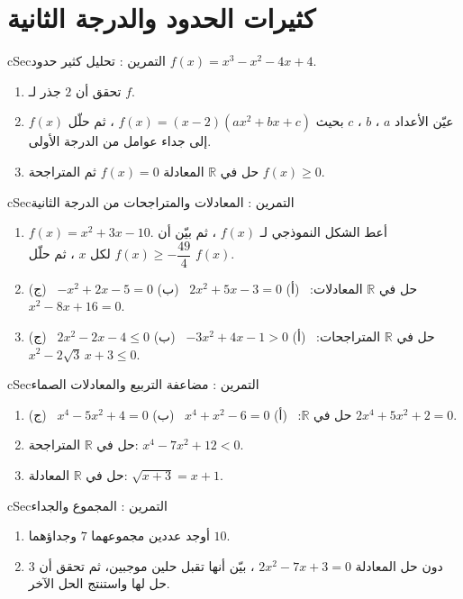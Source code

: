 \documentclass[12pt,a4paper]{article}
\newenvironment{BOX}[2]{\begin{otherlanguage}{english}\begin{arbox}{#1}{#2}}{\end{arbox}\end{otherlanguage}}
\newcounter{exo}
\newenvironment{tamrin}[1]{\stepcounter{exo}\begin{BOX}{cSec}{التمرين \theexo: #1}}{\end{BOX}}
\newcommand{\R}{\mathbb{R}}
\begin{document}
\section{كثيرات الحدود والدرجة الثانية}
\begin{tamrin}{تحليل كثير حدود}
$f(x)=x^3-x^2-4x+4$.
\begin{enumerate}
\item تحقق أن $2$ جذر لـ $f$.
\item عيّن الأعداد $a$ ، $b$ ، $c$ بحيث $f(x)=(x-2)\left(ax^2+bx+c\right)$ ، ثم حلّل $f(x)$ إلى جداء عوامل من الدرجة الأولى.
\item حل في $\R$ المعادلة $f(x)=0$ ثم المتراجحة $f(x)\ge0$.
\end{enumerate}
\end{tamrin}

\begin{tamrin}{المعادلات والمتراجحات من الدرجة الثانية}
\begin{enumerate}
\item $f(x)=x^2+3x-10$. أعط الشكل النموذجي لـ $f(x)$ ، ثم بيّن أن $f(x)\ge-\dfrac{49}{4}$ لكل $x$ ، ثم حلّل $f(x)$.
\item حل في $\R$ المعادلات: \ (أ) $2x^2+5x-3=0$ \ (ب) $-x^2+2x-5=0$ \ (ج) $x^2-8x+16=0$.
\item حل في $\R$ المتراجحات: \ (أ) $-3x^2+4x-1>0$ \ (ب) $2x^2-2x-4\le0$ \ (ج) $x^2-2\sqrt3\,x+3\le0$.
\end{enumerate}
\end{tamrin}

\begin{tamrin}{مضاعفة التربيع والمعادلات الصماء}
\begin{enumerate}
\item حل في $\R$: \ (أ) $x^4+x^2-6=0$ \ (ب) $x^4-5x^2+4=0$ \ (ج) $2x^4+5x^2+2=0$.
\item حل في $\R$ المتراجحة: $x^4-7x^2+12<0$.
\item حل في $\R$ المعادلة: $\sqrt{x+3}=x+1$.
\end{enumerate}
\end{tamrin}

\begin{tamrin}{المجموع والجداء}
\begin{enumerate}
\item أوجد عددين مجموعهما $7$ وجداؤهما $10$.
\item دون حل المعادلة $2x^2-7x+3=0$ ، بيّن أنها تقبل حلين موجبين، ثم تحقق أن $3$ حل لها واستنتج الحل الآخر.
\end{enumerate}
\end{tamrin}
\end{document}

